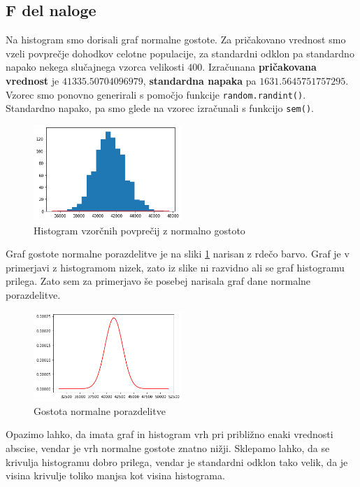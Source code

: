 \documentclass{article}
\begin{document}

\subsection{F del naloge}
Na histogram smo dorisali graf normalne gostote. Za pričakovano vrednost smo vzeli povprečje dohodkov
celotne populacije, za standardni odklon pa standardno napako nekega slučajnega vzorca velikosti $400$.
Izračunana \textbf{pričakovana vrednost} je $41335.50704096979$, \textbf{standardna napaka} pa 
$1631.5645751757295$.
Vzorec smo ponovno generirali s pomočjo funkcije \texttt{random.randint()}. Standardno napako, pa smo glede na vzorec 
izračunali s funkcijo \texttt{sem()}. 

\begin{figure}[H]
    \begin{center}
        \includegraphics*[width=0.5\textwidth]{figure1F.png}
        \caption{Histogram vzorčnih povprečij z normalno gostoto}
        \label{1F}
    \end{center}
\end{figure}

Graf gostote normalne porazdelitve je na sliki \ref{1F} narisan z rdečo barvo. 
Graf je v primerjavi z histogramom nizek, zato iz slike ni razvidno ali se graf histogramu prilega.
Zato sem za primerjavo še posebej narisala graf dane normalne porazdelitve. 

\begin{figure}[H]
    \begin{center}
        \includegraphics*[width=0.5\textwidth]{figure1F(1).png}
        \caption{Gostota normalne porazdelitve}
        \label{1F*}
    \end{center}
\end{figure}
Opazimo lahko, da imata graf in histogram vrh pri približno enaki vrednosti abscise, vendar je vrh normalne 
gostote znatno nižji. Sklepamo lahko, da se krivulja histogramu dobro prilega, vendar je standardni odklon tako velik,
da je visina krivulje toliko manjsa kot visina histograma.
\end{document}
